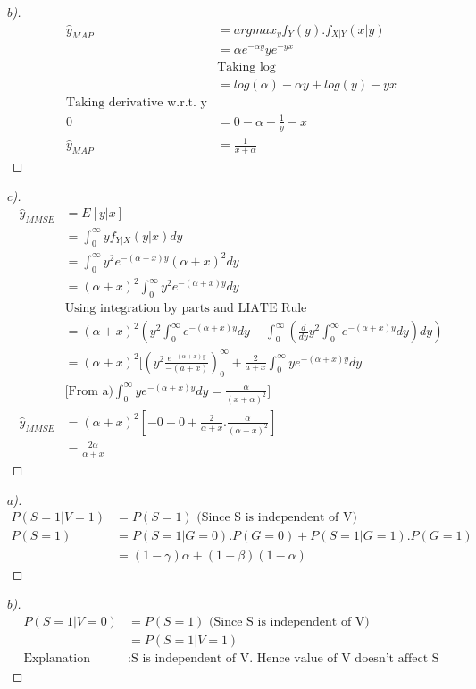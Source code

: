\documentclass[12pt]{article}
\newenvironment{theorem}[2][Theorem]{\begin{trivlist}
\item[\hskip \labelsep {\bfseries #1}\hskip \labelsep {\bfseries #2.}]}{\end{trivlist}}
\begin{document}
\begin{theorem}[Ans]{4}
\begin{proof}[b)]
\begin{align*}
\hat{y}_{MAP} &= argmax_{y} f_{Y}(y).f_{X|Y}(x|y)\\
&= \alpha e^{-\alpha y}y e^{-yx}\\
&\text{Taking log}\\
&=log(\alpha) - \alpha y + log(y) -yx\\
\text{Taking derivative w.r.t. y}\\
0&= 0-\alpha+\frac{1}{y}-x\\
\hat{y}_{MAP} &= \frac{1}{x+\alpha}
\end{align*}
\end{proof}
\begin{proof}[c)]
\begin{align*}
\hat{y}_{MMSE}&=E[y|x]\\
&=\int_{0}^{\infty}yf_{Y|X}(y|x)dy\\
&=\int_{0}^{\infty}y^{2}e^{-(\alpha+x)y}(\alpha+x)^{2}dy\\
&=(\alpha+x)^{2}\int_{0}^{\infty}y^{2}e^{-(\alpha+x)y}dy\\
&\text{Using integration by parts and LIATE Rule}\\
&= (\alpha+x)^{2}(y^{2}\int_{0}^{\infty}e^{-(\alpha+x)y}dy-\int_{0}^{\infty}(\frac{d}{dy}y^{2}\int_{0}^{\infty}e^{-(\alpha+x)y}dy)dy)\\
&=(\alpha+x)^{2}[(y^{2}\frac{e^{-(\alpha+x)y}}{-(a+x)})_{0}^{\infty} + \frac{2}{a+x}\int_{0}^{\infty}ye^{-(\alpha+x)y}dy\\
&\text{[From a)} \int_{0}^{\infty}ye^{-(\alpha+x)y} dy=  \frac{\alpha}{(x+\alpha)^{2}}\text{]}\\
\hat{y}_{MMSE}&=(\alpha+x)^{2}[-0+0+\frac{2}{\alpha+x}.\frac{\alpha}{(\alpha+x)^2}]\\
&=\frac{2\alpha}{\alpha+x}
\end{align*}
\end{proof}
\end{theorem}
\begin{theorem}[Ans]{5}
\begin{proof}[a)]
\begin{align*}
P(S=1|V=1) &= P(S=1) \text{ (Since S is independent of V)}\\
P(S=1) &= P(S=1|G=0).P(G=0)+P(S=1|G=1).P(G=1)\\
&= (1-\gamma)\alpha+(1-\beta)(1-\alpha)
\end{align*}
\end{proof}
\begin{proof}[b)]
\begin{align*}
P(S=1|V=0)  &= P(S=1) \text{ (Since S is independent of V)}\\
&= P(S=1|V=1)\\
\text{Explanation} &: \text{S is independent of V. Hence value of V doesn't affect S}
\end{align*}
\end{proof}
\end{theorem}
\end{document}

